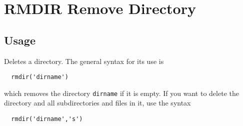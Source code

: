 \section{RMDIR Remove Directory}

\subsection{Usage}

Deletes a directory.  The general syntax for its use is
\begin{verbatim}
  rmdir('dirname')
\end{verbatim}
which removes the directory \verb|dirname| if it is empty.  If you
want to delete the directory and all subdirectories and files
in it, use the syntax
\begin{verbatim}
  rmdir('dirname','s')
\end{verbatim}
